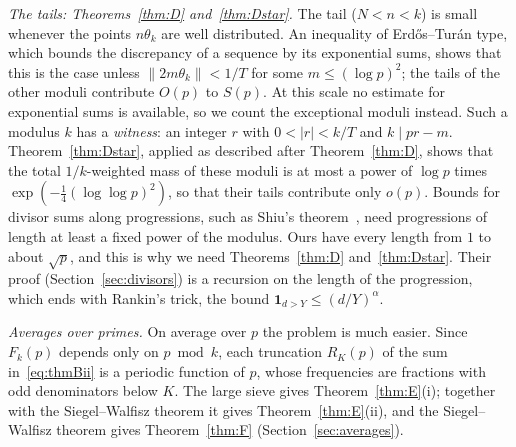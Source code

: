 \emph{The tails: Theorems~\ref{thm:D} and~\ref{thm:Dstar}.} The tail ($N<n<k$) is small whenever the points $n\theta_k$ are well distributed. An inequality of Erd\H{o}s--Tur\'an type, which bounds the discrepancy of a sequence by its exponential sums, shows that this is the case unless $\|2m\theta_k\|<1/T$ for some $m\le(\log p)^2$; the tails of the other moduli contribute $O(p)$ to $S(p)$. At this scale no estimate for exponential sums is available, so we count the exceptional moduli instead. Such a modulus $k$ has a \emph{witness}: an integer $r$ with $0<|r|<k/T$ and $k\mid pr-m$. Theorem~\ref{thm:Dstar}, applied as described after Theorem~\ref{thm:D}, shows that the total $1/k$-weighted mass of these moduli is at most a power of $\log p$ times $\exp(-\frac14(\log\log p)^2)$, so that their tails contribute only $o(p)$. Bounds for divisor sums along progressions, such as Shiu's theorem~\cite{b24}, need progressions of length at least a fixed power of the modulus. Ours have every length from $1$ to about $\sqrt p$, and this is why we need Theorems~\ref{thm:D} and~\ref{thm:Dstar}. Their proof (Section~\ref{sec:divisors}) is a recursion on the length of the progression, which ends with Rankin's trick, the bound $\mathbf 1_{d>Y}\le(d/Y)^\alpha$.

\emph{Averages over primes.} On average over $p$ the problem is much easier. Since $F_k(p)$ depends only on $p\bmod k$, each truncation $R_K(p)$ of the sum in~\eqref{eq:thmBii} is a periodic function of $p$, whose frequencies are fractions with odd denominators below $K$. The large sieve gives Theorem~\ref{thm:E}(i); together with the Siegel--Walfisz theorem it gives Theorem~\ref{thm:E}(ii), and the Siegel--Walfisz theorem gives Theorem~\ref{thm:F} (Section~\ref{sec:averages}).

